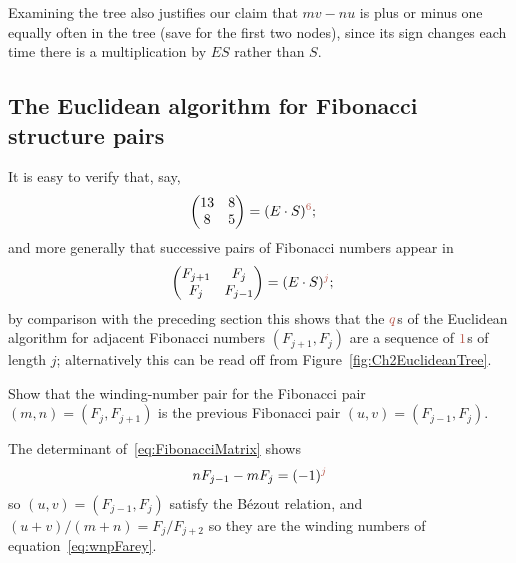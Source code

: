  Examining the tree also justifies our claim that $m v-nu$ is plus or minus one equally often in the tree (save for the first two nodes), since its sign changes each time there is a multiplication by $ES$ rather than $S$.


\subsection{The Euclidean algorithm for Fibonacci structure pairs}
\label{sec:euclidean}
It is easy to verify that, say,
\begin{align*}
	\begin{pmatrix} 
	13 & 8 
		\\
		8 & 5
	\end{pmatrix} &= 	(E\cdot  S)^{\jqn{6}};
\end{align*}
and more generally that successive pairs of Fibonacci numbers appear in
\begin{align}
	\begin{pmatrix} 
		F_{j+1} & F_j 
		\\
		F _j & F_{j-1}
	\end{pmatrix} &= 	(E\cdot  S)^{\jqn{j}};
\label{eq:FibonacciMatrix}
\end{align}
by comparison with the preceding section this shows that the $\jq$s of the Euclidean algorithm for adjacent Fibonacci numbers $(F_{j+1},F_j)$ are a sequence of $\jqn{1}$s of length $j$; alternatively this can be read off from Figure~\ref{fig:Ch2EuclideanTree}.

\begin{jExercise}
	Show that  the winding-number pair for the Fibonacci pair $(m,n)= (F_j,F_{j+1})$ is the previous Fibonacci pair $(u,v)=(F_{j-1},F_j)$.
\end{jExercise}
\begin{jAnswer}  
The determinant of~\eqref{eq:FibonacciMatrix} shows
	\begin{align}
			n F_{j-1} - m F_{j} = (-1)^{\jqn{j}}
	\end{align}
so $(u,v)=(F_{j-1},F_j)$ satisfy the B\'ezout relation, and $(u+v)/(m+n)=F_j/F_{j+2}$ so they are the winding numbers of equation~\ref{eq:wnpFarey}.
\end{jAnswer}


